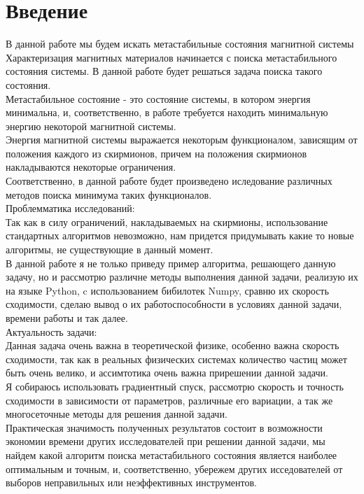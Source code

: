 \documentclass[ 12pt,x11names]{article}
\begin{document}
    \tableofcontents %
    \clearpage
    \section{Введение}    \noindent
    В данной работе мы будем искать метастабильные состояния магнитной системы\\
    Характеризация магнитных материалов начинается с  поиска метастабильного состояния системы.
    В данной работе будет решаться задача поиска такого состояния.\\
        Метастабильное состояние - это состояние системы, в котором энергия минимальна, и, соответственно, в работе требуется находить минимальную энергию некоторой магнитной системы.\\
    Энергия магнитной системы выражается некоторым функционалом, зависящим от положения каждого из скирмионов, причем на положения скирмионов накладываются некоторые ограничения. \\Соответственно, в данной работе будет произведено иследование различных методов поиска минимума таких функционалов.\\
    Проблемматика исследований:\\
     Так как в силу ограничений, накладываемых на скирмионы, использование стандартных алгоритмов невозможно, нам придется придумывать какие то новые алгоритмы, не существующие в данный момент.\\
    В данной работе я не только приведу пример алгоритма, решающего данную задачу, но и   рассмотрю различне методы выполнения данной задачи, реализую их на языке Python, c использованием бибилотек Numpy, сравню их скорость сходимости, сделаю вывод о их работоспособности в условиях данной задачи, времени работы и так далее.\\
    Актуальность задачи:\\
    Данная задача очень важна в теоретической физике, особенно важна скорость сходимости, так как в реальных физических системах количество частиц может быть очень велико, и ассимтотика очень важна прирешении данной задачи.\\
    Я собираюсь использовать градиентный спуск, рассмотрю скорость и точность сходимости в зависимости от параметров, различные его вариации, а так же многосеточные методы для решения данной задачи.\\
     Практическая значимость полученных результатов состоит в возможности экономии времени других исследователей при решении данной задачи, мы найдем какой алгоритм поиска метастабильного состояния является наиболее оптимальным и точным, и, соответственно, убережем других исседователей от выборов неправильных или неэффективных инструментов.\\
\end{document}
